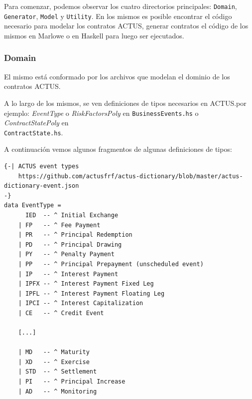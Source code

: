 \documentclass[12pt]{book}
\begin{document}
Para comenzar, podemos observar los cuatro directorios principales: \texttt{Domain}, \texttt{Generator}, \texttt{Model} y \texttt{Utility}. En los mismos es posible encontrar el código necesario para modelar los contratos ACTUS, generar contratos el código de los mismos en Marlowe o en Haskell para luego ser ejecutados.

\subsubsection{Domain}

El mismo está conformado por los archivos que modelan el dominio de los contratos ACTUS.\@


A lo largo de los mismos, se ven definiciones de tipos necesarios en ACTUS.\@Como por ejemplo: \textit{EventType} o \textit{RiskFactorsPoly} en \texttt{BusinessEvents.hs} o \textit{ContractStatePoly} en\\ \texttt{ContractState.hs}.

A continuación vemos algunos fragmentos de algunas definiciones de tipos:

\begin{lstlisting}[style=Haskell-cardano, caption=Algunos tipos de eventos.]
{-| ACTUS event types
    https://github.com/actusfrf/actus-dictionary/blob/master/actus-dictionary-event.json
-}
data EventType =
      IED  -- ^ Initial Exchange
    | FP   -- ^ Fee Payment
    | PR   -- ^ Principal Redemption
    | PD   -- ^ Principal Drawing
    | PY   -- ^ Penalty Payment
    | PP   -- ^ Principal Prepayment (unscheduled event)
    | IP   -- ^ Interest Payment
    | IPFX -- ^ Interest Payment Fixed Leg
    | IPFL -- ^ Interest Payment Floating Leg
    | IPCI -- ^ Interest Capitalization
    | CE   -- ^ Credit Event

    [...]

    | MD   -- ^ Maturity
    | XD   -- ^ Exercise
    | STD  -- ^ Settlement
    | PI   -- ^ Principal Increase
    | AD   -- ^ Monitoring
\end{lstlisting}
\end{document}
